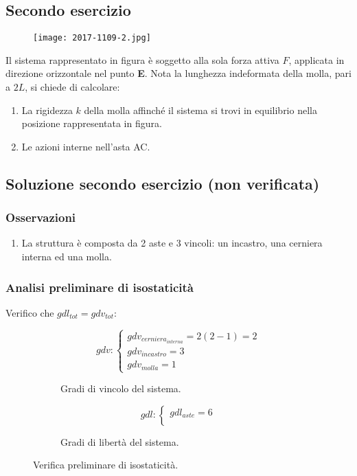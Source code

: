 \documentclass[main.tex]{subfiles}
\begin{document}
\subsection{Secondo esercizio}

\begin{figure}[H]
\centering
\texttt{[image: 2017-1109-2.jpg]}
\end{figure}

Il sistema rappresentato in figura è soggetto alla sola forza attiva $F$, applicata in direzione orizzontale nel punto \textbf{E}.
Nota la lunghezza indeformata della molla, pari a $2L$, si chiede di calcolare:

\begin{enumerate}
\item La rigidezza $k$ della molla affinché il sistema si trovi in equilibrio nella posizione rappresentata in figura.
\item Le azioni interne nell’asta AC.
\end{enumerate}

\clearpage

\subsection{Soluzione secondo esercizio (non verificata)}

\subsubsection{Osservazioni}

\begin{enumerate}
\item La struttura è composta da 2 aste e 3 vincoli: un incastro, una cerniera interna ed una molla.
\end{enumerate}

\subsubsection{Analisi preliminare di isostaticità}
Verifico che $gdl_{tot} = gdv_{tot}$:
\begin{figure}[H]
  \begin{subfigure}[b]{.5\textwidth}
  \centering
  \[
  	gdv: \begin{cases}
		gdv_{cerniera_{interna}} = 2(2-1)=2\\
		gdv_{incastro} = 3\\
		gdv_{molla} = 1
  	\end{cases}
  \]
  \caption{Gradi di vincolo del sistema.}
  \end{subfigure}
  \hfill
  \begin{subfigure}[b]{.5\textwidth}
  \centering
  \[
  	gdl: \begin{cases}
  		gdl_{aste} = 6\\
  	\end{cases}
  \]
  \caption{Gradi di libertà del sistema.}
  \end{subfigure}
  \caption{Verifica preliminare di isostaticità.}
\end{figure}
\end{document}
